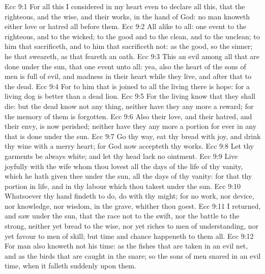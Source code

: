 \vs Ecc 9:1 For all this I considered in my heart even to declare all this, that the righteous, and the wise, and their works,  in the hand of God: no man knoweth either love or hatred  all  before them.
\vs Ecc 9:2 All  alike to all:  one event to the righteous, and to the wicked; to the good and to the clean, and to the unclean; to him that sacrificeth, and to him that sacrificeth not: as  the good, so  the sinner;  he that sweareth, as  that feareth an oath.
\vs Ecc 9:3 This  an evil among all  that are done under the sun, that  one event unto all: yea, also the heart of the sons of men is full of evil, and madness  in their heart while they live, and after that  to the dead.
\vs Ecc 9:4 For to him that is joined to all the living there is hope: for a living dog is better than a dead lion.
\vs Ecc 9:5 For the living know that they shall die: but the dead know not any thing, neither have they any more a reward; for the memory of them is forgotten.
\vs Ecc 9:6 Also their love, and their hatred, and their envy, is now perished; neither have they any more a portion for ever in any  that is done under the sun.
\vs Ecc 9:7 Go thy way, eat thy bread with joy, and drink thy wine with a merry heart; for God now accepteth thy works.
\vs Ecc 9:8 Let thy garments be always white; and let thy head lack no ointment.
\vs Ecc 9:9 Live joyfully with the wife whom thou lovest all the days of the life of thy vanity, which he hath given thee under the sun, all the days of thy vanity: for that  thy portion in  life, and in thy labour which thou takest under the sun.
\vs Ecc 9:10 Whatsoever thy hand findeth to do, do  with thy might; for  no work, nor device, nor knowledge, nor wisdom, in the grave, whither thou goest.
\vs Ecc 9:11 I returned, and saw under the sun, that the race  not to the swift, nor the battle to the strong, neither yet bread to the wise, nor yet riches to men of understanding, nor yet favour to men of skill; but time and chance happeneth to them all.
\vs Ecc 9:12 For man also knoweth not his time: as the fishes that are taken in an evil net, and as the birds that are caught in the snare; so  the sons of men snared in an evil time, when it falleth suddenly upon them.
